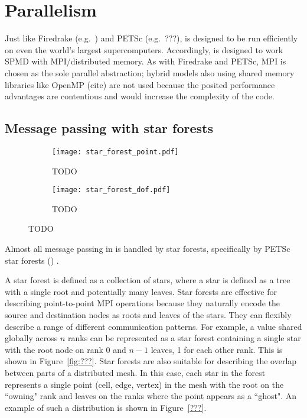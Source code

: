 \documentclass[thesis]{subfiles}
\begin{document}

\chapter{Parallelism}
\label{chapter:parallel}

Just like Firedrake (e.g.~\cite{betteridgeCodeGenerationProductive2021}) and PETSc (e.g.~???),  is designed to be run efficiently on even the world's largest supercomputers.
Accordingly,  is designed to work SPMD with MPI/distributed memory.
As with Firedrake and PETSc, MPI is chosen as the sole parallel abstraction; hybrid models also using shared memory libraries like OpenMP (cite) are not used because the posited performance advantages are contentious \parencite{knepleyExascaleComputingThreads2015} and would increase the complexity of the code.

\section{Message passing with star forests}

\begin{figure}
  \centering
  \begin{subfigure}{\textwidth}
    \centering
    \texttt{[image: star\_forest\_point.pdf]}
    \caption{TODO}
    \label{fig:star_forest_point}
  \end{subfigure}
  \begin{subfigure}{\textwidth}
    \centering
    \texttt{[image: star\_forest\_dof.pdf]}
    \caption{TODO}
    \label{fig:star_forest_dof}
  \end{subfigure}
  \caption{TODO}
  \label{fig:star_forest}
\end{figure}

Almost all message passing in  is handled by star forests, specifically by PETSc star forests () \parencite{zhangPetscSFScalableCommunication2021}.

A star forest is defined as a collection of stars, where a star is defined as a tree with a single root and potentially many leaves.
Star forests are effective for describing point-to-point MPI operations because they naturally encode the source and destination nodes as roots and leaves of the stars.
They can flexibly describe a range of different communication patterns.
For example, a value shared globally across $n$ ranks can be represented as a star forest containing a single star with the root node on rank 0 and $n-1$ leaves, 1 for each other rank.
This is shown in Figure~\ref{fig:???}.
Star forests are also suitable for describing the overlap between parts of a distributed mesh.
In this case, each star in the forest represents a single point (cell, edge, vertex) in the mesh with the root on the ``owning" rank and leaves on the ranks where the point appears as a ``ghost".
An example of such a distribution is shown in Figure~\ref{???}.
\end{document}
